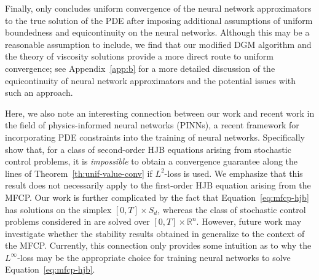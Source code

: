 \documentclass[11pt,reqno]{amsart}
\numberwithin{equation}{section}
\theoremstyle{plain}
\newcommand{\R}{\mathbb{R}}
\begin{document}
Finally, \cite{dgm} only concludes uniform convergence of the neural network approximators to the true solution of the PDE after imposing additional assumptions of uniform boundedness and equicontinuity on the neural networks. Although this may be a reasonable assumption to include, we find that our modified DGM algorithm and the theory of viscosity solutions provide a more direct route to uniform convergence; see Appendix~\ref{app:b} for a more detailed discussion of the equicontinuity of neural network approximators and the potential issues with such an approach.

Here, we also note an interesting connection between our work and recent work in the field of physics-informed neural networks (PINNs), a recent framework for incorporating PDE constraints into the training of neural networks. Specifically \cite{l2-pinns} show that, for a class of second-order HJB equations arising from stochastic control problems, it is \textit{impossible} to obtain a convergence guarantee along the lines of Theorem~\ref{th:unif-value-conv} if $L^2$-loss is used. We emphasize that this result does not necessarily apply to the first-order HJB equation arising from the MFCP. Our work is further complicated by the fact that Equation~\eqref{eq:mfcp-hjb} has solutions on the simplex $[0, T] \times S_d$, whereas the class of stochastic control problems considered in \cite{l2-pinns} are solved over $[0, T] \times \R^n$. However, future work may investigate whether the stability results obtained in \cite{l2-pinns} generalize to the context of the MFCP. Currently, this connection only provides some intuition as to why the $L^\infty$-loss may be the appropriate choice for training neural networks to solve Equation~\eqref{eq:mfcp-hjb}.
\end{document}
